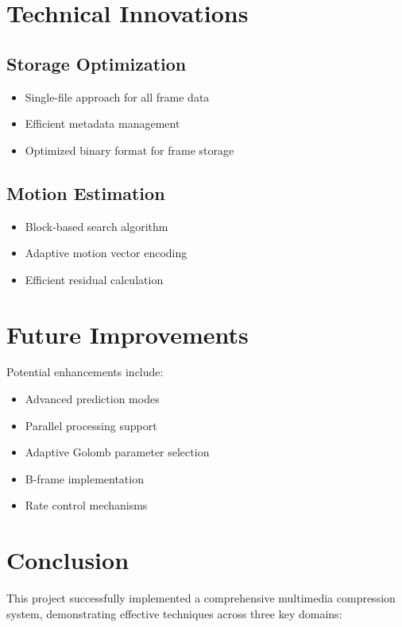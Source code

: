\documentclass[a4paper,14pt]{article}
\begin{document}
\section{Technical Innovations}

\subsection{Storage Optimization}
\begin{itemize}
    \item Single-file approach for all frame data
    \item Efficient metadata management
    \item Optimized binary format for frame storage
\end{itemize}

\subsection{Motion Estimation}
\begin{itemize}
    \item Block-based search algorithm
    \item Adaptive motion vector encoding
    \item Efficient residual calculation
\end{itemize}

\section{Future Improvements}
Potential enhancements include:
\begin{itemize}
    \item Advanced prediction modes
    \item Parallel processing support
    \item Adaptive Golomb parameter selection
    \item B-frame implementation
    \item Rate control mechanisms
\end{itemize}

\section{Conclusion}
This project successfully implemented a comprehensive multimedia compression system, demonstrating effective techniques across three key domains:
\end{document}
